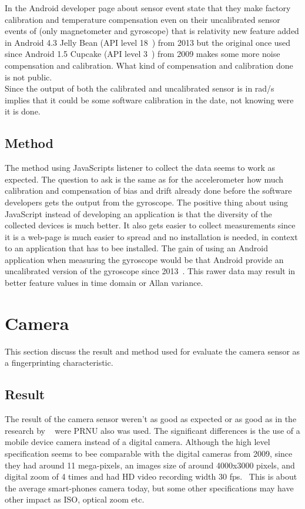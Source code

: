 In the Android developer page about sensor event \cite[]{android:sensorEvent} state that they make factory calibration and temperature compensation even on their uncalibrated sensor events of (only magnetometer and gyroscope) that is relativity new feature added in Android 4.3 Jelly Bean (API level 18~\cite{android:API18}) from 2013 but the original once used since Android 1.5 Cupcake (API level 3~\cite{android:API3}) from 2009 makes some more noise compensation and calibration. What kind of compensation and calibration done is not public. \\
Since the output of both the calibrated and uncalibrated sensor is in rad/s implies that it could be some software calibration in the date, not knowing were it is done.

\subsection{Method}
The method using JavaScripts listener to collect the data seems to work as expected. The question to ask is the same as for the accelerometer how much calibration and compensation of bias and drift already done before the software developers gets the output from the gyroscope. The positive thing about using JavaScript instead of developing an application is that the diversity of the collected devices is much better. It also gets easier to collect measurements since it is a web-page is much easier to spread and no installation is needed, in context to an application that has to bee installed. The gain of using an Android application when measuring the gyroscope would be that Android provide an uncalibrated version of the gyroscope since 2013~\cite{android:API18}. This rawer data may result in better feature values in time domain or Allan variance.


\section{Camera}
This section discuss the result and method used for evaluate the camera sensor as a fingerprinting characteristic.
\subsection{Result}
The result of the camera sensor weren't as good as expected or as good as in the research by ~\cite[]{sensor:camera:DCIdent} were PRNU also was used. The significant differences is the use of a mobile device camera instead of a digital camera. Although the high level specification seems to bee comparable with the digital cameras from 2009, since they had around 11 mega-pixels, an images size of around 4000x3000 pixels, and digital zoom of 4 times and had HD video recording width 30 fps.~\cite[]{gbg:kamera} This is about the average smart-phones camera today, but some other specifications may have other impact as ISO, optical zoom etc.

